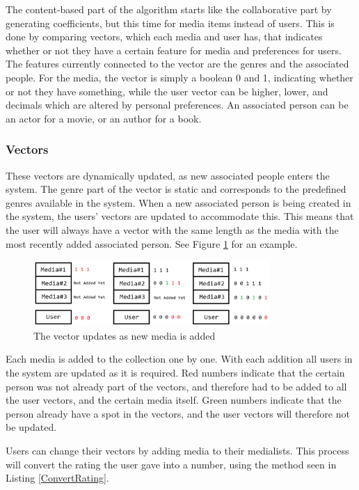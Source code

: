 The content-based part of the algorithm starts like the collaborative part by generating coefficients, but this time for media items instead of users. This is done by comparing vectors, which each media and user has, that indicates whether or not they have a certain feature for media and preferences for users. The features currently connected to the vector are the genres and the associated people. For the media, the vector is simply a boolean 0 and 1, indicating whether or not they have something, while the user vector can be higher, lower, and decimals which are altered by personal preferences. An associated person can be an actor for a movie, or an author for a book.

\subsubsection{Vectors}

These vectors are dynamically updated, as new associated people enters the system. The genre part of the vector is static and corresponds to the predefined genres available in the system. When a new associated person is being created in the system, the users' vectors are updated to accommodate this. This means that the user will always have a vector with the same length as the media with the most recently added associated person. See Figure \ref{VectorUpdate} for an example.

\begin{figure}[htb]
\centering
\includegraphics[width=0.8\textwidth]{Images/VectorUpdate.png}
\caption{The vector updates as new media is added}
\label{VectorUpdate}
\end{figure}

Each media is added to the collection one by one. With each addition all users in the system are updated as it is required. Red numbers indicate that the certain person was not already part of the vectors, and therefore had to be added to all the user vectors, and the certain media itself. Green numbers indicate that the person already have a spot in the vectors, and the user vectors will therefore not be updated.

Users can change their vectors by adding media to their medialists. This process will convert the rating the user gave into a number, using the method seen in Listing \ref{ConvertRating}.

